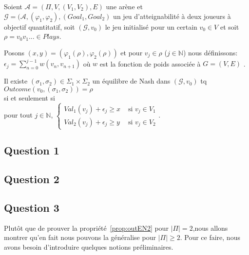 \begin{propriete}
	\label{prop:outEN2}
	Soient $\mathcal{A} = (\Pi, V, (V_{1}, V_{2}), E)$ une arène et $\mathcal{G} = (\mathcal{A}, (\varphi _{1}, \varphi _{2}), (Goal_{1}, Goal_{2})$ un jeu d'atteignabilité à deux joueurs à objectif quantitatif, soit $(\mathcal{G}, v_{0})$ le jeu initialisé pour un certain $v_{0} \in V $ et soit $\rho = v_{0}v_{1}... \in Plays$. 
	
	Posons $(x,y) = (\varphi _{1}(\rho), \varphi _{2}(\rho))$ et pour $v_{j} \in \rho$ ($j \in \mathbb{N}$) nous définissons: $\epsilon _{j} = \sum _{n= 0} ^{j-1} w(v_{n},v_{n+1})$ où $w$ est la fonction de poids associée à $G = (V,E)$ .
	
	\begin{center}Il existe $(\sigma _{1},\sigma _{2}) \in \Sigma _{1} \times \Sigma _{2}$ un équilibre de Nash dans $(\mathcal{G},v_{0})$ tq $Outcome(v_{0},(\sigma _{1},\sigma _{2})) = \rho$\\ $\text{}$\\ si et seulement si\\$\text{}$\\ pour tout $j \in \mathbb{N}$, $\begin{cases}
													Val_{1}(v_{j}) + \epsilon _{j} \geq x & \text{ si } v_{j} \in V_{1} \\
													Val_{2}(v_{j}) + \epsilon _{j} \geq y & \text{ si } v_{j} \in V_{2} 
													\end{cases}$.\end{center}  
\end{propriete}
	
\subsection{Question 1}
\subsection{Question 2}
\subsection{Question 3}
Plutôt que de prouver la propriété~\ref{prop:outEN2} pour $|\Pi|= 2$,nous allons montrer qu'en fait nous pouvons la généralise pour $|\Pi| \geq 2 .$ Pour ce faire, nous avons besoin d'introduire quelques notions préliminaires.


